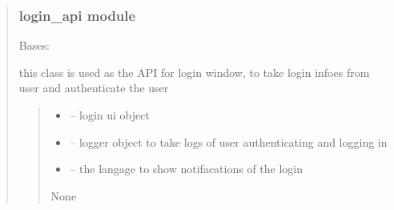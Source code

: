\documentclass[letterpaper,10pt,english]{sphinxmanual}
\begin{document}
\begin{quote}
\begin{savenotes}
\begin{fulllineitems}
\end{fulllineitems}\end{savenotes}


\sphinxstepscope


\subsubsection{login\_api module}
\label{\detokenize{setting/login_api:module-oxin.login_api}}\label{\detokenize{setting/login_api:login-api-module}}\label{\detokenize{setting/login_api::doc}}

\begin{savenotes}\begin{fulllineitems}
\label{\detokenize{setting/login_api:oxin.login_api.API}}
\pysigstartsignatures
{}
\pysigstopsignatures
\sphinxAtStartPar
Bases: 

\sphinxAtStartPar
this class is used as the API for login window, to take login infoes from user and authenticate the user
\begin{quote}\begin{description}
\begin{itemize}
\item {} 
\sphinxAtStartPar
{} – login ui object

\item {} 
\sphinxAtStartPar
{} – logger object to take logs of user authenticating and logging in

\item {} 
\sphinxAtStartPar
{} – the langage to show notifacations of the login

\end{itemize}

\sphinxAtStartPar
None


\end{description}
\end{quote}
\end{fulllineitems}
\end{savenotes}
\end{quote}
\end{document}
